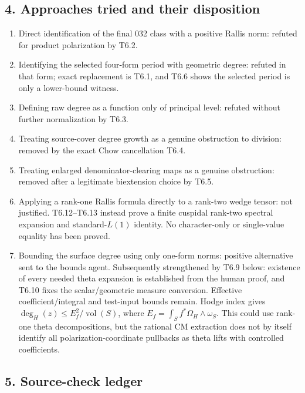 \documentclass[11pt,a4paper]{article}
\providecommand{\tightlist}{\setlength{\itemsep}{0pt}\setlength{\parskip}{0pt}}
\theoremstyle{definition}
\begin{document}
\subsection{4. Approaches tried and their disposition}\label{approaches-tried-and-their-disposition}

\begin{enumerate}
\def\labelenumi{\arabic{enumi}.}
\tightlist
\item
  Direct identification of the final 032 class with a positive Rallis norm: refuted for product polarization by T6.2.
\item
  Identifying the selected four-form period with geometric degree: refuted in that form; exact replacement is T6.1, and T6.6 shows the selected period is only a lower-bound witness.
\item
  Defining raw degree as a function only of principal level: refuted without further normalization by T6.3.
\item
  Treating source-cover degree growth as a genuine obstruction to division: removed by the exact Chow cancellation T6.4.
\item
  Treating enlarged denominator-clearing maps as a genuine obstruction: removed after a legitimate biextension choice by T6.5.
\item
  Applying a rank-one Rallis formula directly to a rank-two wedge tensor: not justified. T6.12--T6.13 instead prove a finite cuspidal rank-two spectral expansion and standard-\(L(1)\) identity. No character-only or single-value equality has been proved.
\item
  Bounding the surface degree using only one-form norms: positive alternative sent to the bounds agent. Subsequently strengthened by T6.9 below: existence of every needed theta expansion is established from the human proof, and T6.10 fixes the scalar/geometric measure conversion. Effective coefficient/integral and test-input bounds remain. Hodge index gives \(\deg_H(z)\le E_f^2/\operatorname{vol}(S)\), where \(E_f=\int_Sf^*\Omega_H\wedge\omega_S\). This could use rank-one theta decompositions, but the rational CM extraction does not by itself identify all polarization-coordinate pullbacks as theta lifts with controlled coefficients.
\end{enumerate}

\subsection{5. Source-check ledger}\label{source-check-ledger}
\end{document}
